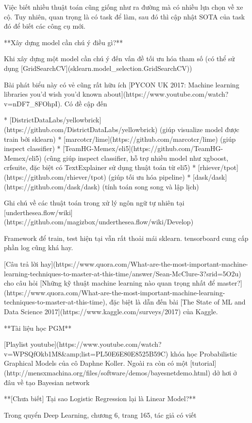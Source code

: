 Việc biết nhiều thuật toán cũng giống như ra đường mà có nhiều lựa chọn về xe cộ. Tuy nhiên, quan trọng là có task để làm, sau đó thì cập nhật SOTA của task đó để biết các công cụ mới.

**Xây dựng model cần chú ý điều gì?**

Khi xây dựng một model cần chú ý đến vấn đề tối ưu hóa tham số (có thể sử dụng [GridSearchCV](sklearn.model_selection.GridSearchCV))

Bài phát biểu này có vẻ cũng rất hữu ích [PYCON UK 2017: Machine learning libraries you'd wish you'd known about](https://www.youtube.com/watch?v=nDF7_8FOhpI). Có đề cập đến

* [DistrictDataLabs/yellowbrick](https://github.com/DistrictDataLabs/yellowbrick) (giúp visualize model được train bởi sklearn)
* [marcotcr/lime](https://github.com/marcotcr/lime) (giúp inspect classifier)
* [TeamHG-Memex/eli5](https://github.com/TeamHG-Memex/eli5) (cũng giúp inspect classifier, hỗ trợ nhiều model như xgboost, crfsuite, đặc biệt có TextExplainer sử dụng thuật toán từ eli5)
* [rhiever/tpot](https://github.com/rhiever/tpot) (giúp tối ưu hóa pipeline)
* [dask/dask](https://github.com/dask/dask) (tính toán song song và lập lịch)

Ghi chú về các thuật toán trong xử lý ngôn ngữ tự nhiên tại [underthesea.flow/wiki](https://github.com/magizbox/underthesea.flow/wiki/Develop)

Framework để train, test hiện tại vẫn rất thoải mái sklearn. tensorboard cung cấp phần log cũng khá hay.

[Câu trả lời hay](https://www.quora.com/What-are-the-most-important-machine-learning-techniques-to-master-at-this-time/answer/Sean-McClure-3?srid=5O2u) cho câu hỏi [Những kỹ thuật machine learning nào quan trọng nhất để master?](https://www.quora.com/What-are-the-most-important-machine-learning-techniques-to-master-at-this-time), đặc biệt là dẫn đến bài [The State of ML and Data Science 2017](https://www.kaggle.com/surveys/2017) của Kaggle.

**Tài liệu học PGM**

[Playlist youtube](https://www.youtube.com/watch?v=WPSQfOkb1M8&amp;list=PL50E6E80E8525B59C) khóa học Probabilistic Graphical Models của cô Daphne Koller. Ngoài ra còn có một [tutorial](http://mensxmachina.org/files/software/demos/bayesnetdemo.html) dở hơi ở đâu về tạo Bayesian network

**[Chưa biết] Tại sao Logistic Regression lại là Linear Model?**

Trong quyển Deep Learning, chương 6, trang 165, tác giả có viết

